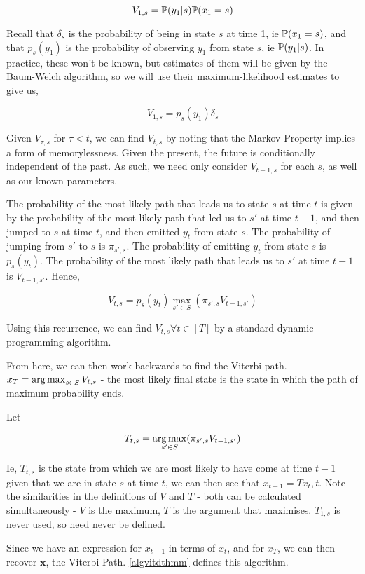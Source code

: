 $$
V_{1,s} = \mathbb{P} (y_1|s)\mathbb{P}(x_1=s)
$$

Recall that $\delta_s$ is the probability of being in state $s$ at time 1, ie $\mathbb{P}(x_1=s)$, and that $p_s(y_1)$ is the probability of observing $y_1$ from state $s$, ie $\mathbb{P} (y_1|s)$. In practice, these won't be known, but estimates of them will be given by the Baum-Welch algorithm, so we will use their maximum-likelihood estimates to give us,

$$
V_{1,s} = p_s(y_1)\delta_s
$$

Given $V_{\tau,s}$ for $\tau < t$, we can find $V_{t,s}$ by noting that the Markov Property implies a form of memorylessness. Given the present, the future is conditionally independent of the past. As such, we need only consider $V_{t-1,s}$ for each $s$, as well as our known parameters. 

The probability of the most likely path that leads us to state $s$ at time $t$ is given by the probability of the most likely path that led us to $s'$ at time $t-1$, and then jumped to $s$ at time $t$, and then emitted $y_t$ from state $s$. The probability of jumping from $s'$ to $s$ is $\pi_{s',s}$. The probability of emitting $y_t$ from state $s$ is $p_s(y_t)$. The probability of the most likely path that leads us to $s'$ at time $t-1$ is $V_{t-1,s'}$. Hence,

$$
V_{t,s} = p_s(y_t) \max_{s'\in S} (\pi_{s',s}V_{t-1,s'})
$$

Using this recurrence, we can find $V_{t,s} \forall t \in [T]$ by a standard dynamic programming algorithm.

From here, we can then work backwards to find the Viterbi path. $x_T = \operatorname*{arg\,max}_{s \in S} V_{t,s}$ - the most likely final state is the state in which the path of maximum probability ends.

Let
 
$$
T_{t,s} = \operatorname*{arg\,max}_{s'\in S}(\pi_{s',s}V_{t-1,s'})
$$

Ie, $T_{t,s}$ is the state from which we are most likely to have come at time $t-1$ given that we are in state $s$ at time $t$, we can then see that $x_{t-1} = T{x_t,t}$. Note the similarities in the definitions of $V$ and $T$ - both can be calculated simultaneously - $V$ is the maximum, $T$ is the argument that maximises. $T_{1,s}$ is never used, so need never be defined. 

Since we have an expression for $x_{t-1}$ in terms of $x_t$, and for $x_T$, we can then recover $\mathbf{x}$, the Viterbi Path. \ref{algvitdthmm} defines this algorithm.

